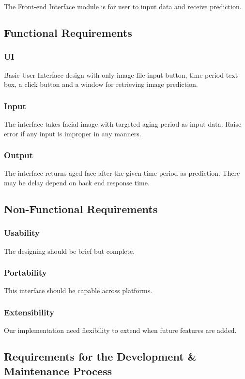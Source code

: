 \documentclass[12pt]{article}
\begin{document}
\noindent The Front-end Interface module is for user to input data and receive prediction.

\subsection{Functional Requirements}
\subsubsection{UI}
Basic User Interface design with only image file input button, time period text box, a click button and a window for retrieving image prediction.
\subsubsection{Input}\label{input}
The interface takes facial image with targeted aging period as input data. Raise error if any input is improper in any manners.
\subsubsection{Output}
The interface returns aged face after the given time period as prediction. There may be delay depend on back end response time.

\subsection{Non-Functional Requirements}

\subsubsection {Usability}

The designing should be brief but complete.

\subsubsection {Portability}

This interface should be capable across platforms.

\subsubsection {Extensibility}
 
Our implementation need flexibility to extend when future features are added.

\subsection{Requirements for the Development \& Maintenance Process}
\end{document}
